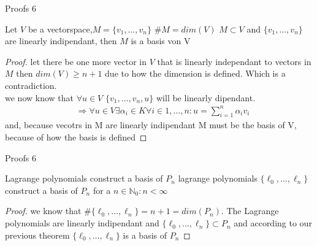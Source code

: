 \documentclass[8pt]{beamer}
\begin{document}
\begin{frame}{Proofs 6}
	\begin{theorem}
		Let $V$ be a vectorspace,$M = \{v_1, \ldots, v_n\}$ $\# M = dim(V)$  $M\subset V$ and $\{v_1, \ldots, v_n\}$ are linearly indipendant, then $M$ is a basis von V 
	\end{theorem}
	\begin{proof}
		let there be one more vector in $V$ that is linearly independant to vectors in $M$ then $dim(V) \geq n+1$ due to how the dimension is defined. Which is a contradiction. \\ 
		we now know that $\forall u \in V$ $\{v_1, \ldots, v_n, u\}$ will be linearly dipendant.
		\begin{align*}
			 &\Rightarrow \forall u \in V \exists \alpha_i \in K \forall i \in 1, \ldots, n: u = \sum_{i = 1}^{n}\alpha_i v_i 
		\end{align*}
		and, because vecotrs in M are linearly indipendant M must be the basis of V, because of how the basis is defined
	\end{proof}
	
\end{frame}

\begin{frame}{Proofs 6}
	\begin{theorem}{Lagrange polynomials construct a basis of $P_n$}
		lagrange polynomials $\{\ell_0,\ldots, \ell_n\}$ construct a basis of $P_n$ for a $n\in \mathbb{N}_0: n <\infty$
	\end{theorem}
	\begin{proof}
		we know that $\#\{\ell_0,\ldots, \ell_n\} = n+1 = dim(P_n)$. The Lagrange polynomials are linearly indipendant and $\{\ell_0,\ldots, \ell_n\} \subset P_n$ and according to our previous theorem $\{\ell_0,\ldots, \ell_n\}$ is a basis of $P_n$
	\end{proof}
	
\end{frame}
\end{document}
